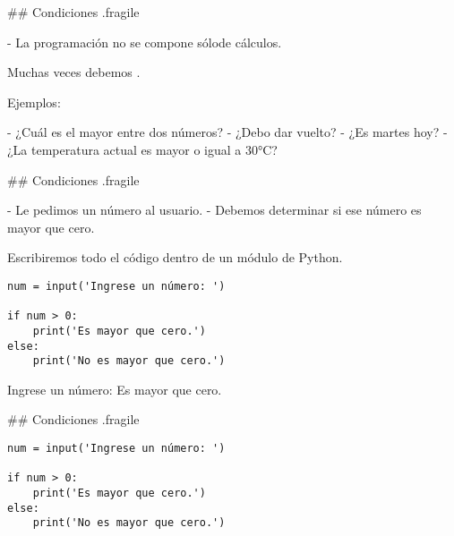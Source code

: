 ## Condiciones {.fragile}


- La programación no se compone sólo\newline de cálculos.

\pause

\bgnblockidea
Muchas veces debemos .
\trmblockidea

\vspace{2ex}

Ejemplos:

- ¿Cuál es el mayor entre dos números?
- ¿Debo dar vuelto?
- ¿Es martes hoy?
- ¿La temperatura actual es mayor o igual a 30°C?

## Condiciones {.fragile}



- Le pedimos un número al usuario.
- Debemos determinar si ese número es mayor que cero.

\bgnblocknormal[wd=.8\textwidth,centered]
Escribiremos todo el código dentro de un módulo de Python.
\trmblocknormal

\pause

\bgncolumns
{}
\vspace{-1ex}

\begin{lstlisting}
num = input('Ingrese un número: ')

if num > 0:
    print('Es mayor que cero.')
else:
    print('No es mayor que cero.')
\end{lstlisting}

\vspace{-1ex}

\begin{exampleConsole}
Ingrese un número: 
Es mayor que cero.
\end{exampleConsole}

\trmcolumns


## Condiciones {.fragile}


\bgncolumns
{}
\vspace{-1ex}


\begin{lstlisting}
num = input('Ingrese un número: ')

if num > 0:
    print('Es mayor que cero.')
else:
    print('No es mayor que cero.')
\end{lstlisting}


